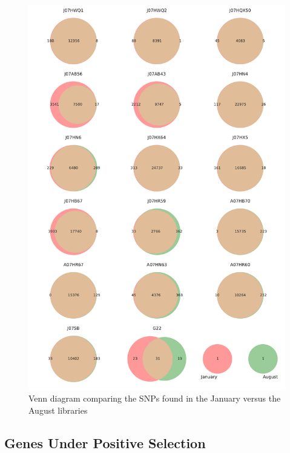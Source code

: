 \begin{figure}[!hbtp]
  \centering
  \includegraphics[width=\textwidth,height=0.9\textheight,keepaspectratio]{Chapter5/Figures/Venn_JanAugSNPs.pdf}
  \caption{Venn diagram comparing the SNPs found in the January versus the August libraries}
  \label{VennBoth}
\end{figure}


\clearpage
\subsection{Genes Under Positive Selection}

